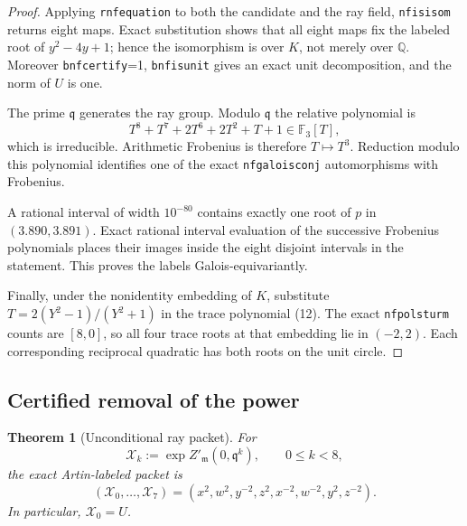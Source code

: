 \documentclass[11pt]{article}
\newtheorem{theorem}{Theorem}
\newcommand{\Q}{\mathbb Q}
\begin{document}
\begin{proof}
Applying \texttt{rnfequation} to both the candidate and the ray field,
\texttt{nfisisom} returns eight maps.  Exact substitution shows that
all eight maps fix the labeled root of $y^2-4y+1$; hence the
isomorphism is over $K$, not merely over $\Q$.  Moreover
\texttt{bnfcertify}=1, \texttt{bnfisunit} gives an exact unit
decomposition, and the norm of $U$ is one.

The prime $\mathfrak q$ generates the ray group.  Modulo
$\mathfrak q$ the relative polynomial is
\[
 T^8+T^7+2T^6+2T^2+T+1\in\mathbb F_3[T],
\]
which is irreducible.  Arithmetic Frobenius is therefore $T\mapsto
T^3$.  Reduction modulo this polynomial identifies one of the exact
\texttt{nfgaloisconj} automorphisms with Frobenius.

A rational interval of width $10^{-80}$ contains exactly one root of
$p$ in $(3.890,3.891)$.  Exact rational interval evaluation of the
successive Frobenius polynomials places their images inside the eight
disjoint intervals in the statement.  This proves the labels
Galois-equivariantly.

Finally, under the nonidentity embedding of $K$, substitute
$T=2(Y^2-1)/(Y^2+1)$ in the trace polynomial (12).
The exact \texttt{nfpolsturm} counts are $[8,0]$, so all four trace
roots at that embedding lie in $(-2,2)$.  Each corresponding
reciprocal quadratic has both roots on the unit circle.
\end{proof}

\subsection{Certified removal of the power}

\begin{theorem}[Unconditional ray packet]\label{thm:packet}
For
\[
 \mathcal X_k:=\exp Z'_{\mathfrak m}(0,\mathfrak q^k),
 \qquad 0\le k<8,
\]
the exact Artin-labeled packet is
\[
(\mathcal X_0,\ldots,\mathcal X_7)
=(x^2,w^2,y^{-2},z^2,x^{-2},w^{-2},y^2,z^{-2}).
\tag{15}
\]
In particular, $\mathcal X_0=U$.
\end{theorem}
\end{document}
